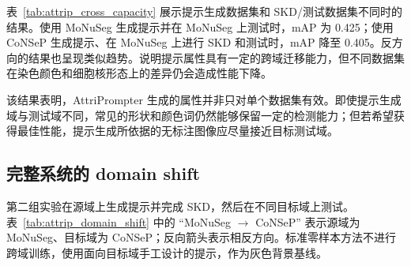 表~\ref{tab:attrip_cross_capacity} 展示提示生成数据集和 SKD/测试数据集不同时的结果。使用 MoNuSeg 生成提示并在 MoNuSeg 上测试时，mAP 为 0.425；使用 CoNSeP 生成提示、在 MoNuSeg 上进行 SKD 和测试时，mAP 降至 0.405。反方向的结果也呈现类似趋势。说明提示属性具有一定的跨域迁移能力，但不同数据集在染色颜色和细胞核形态上的差异仍会造成性能下降。

\begin{table}[t]
\caption{AttriPrompter 跨域能力验证。}
\label{tab:attrip_cross_capacity}
\begin{center}
\end{center}
\vskip -0.15in
\end{table}

该结果表明，AttriPrompter 生成的属性并非只对单个数据集有效。即使提示生成域与测试域不同，常见的形状和颜色词仍然能够保留一定的检测能力；但若希望获得最佳性能，提示生成所依据的无标注图像应尽量接近目标测试域。

\subsection{完整系统的 domain shift}

第二组实验在源域上生成提示并完成 SKD，然后在不同目标域上测试。表~\ref{tab:attrip_domain_shift} 中的 ``MoNuSeg $\rightarrow$ CoNSeP'' 表示源域为 MoNuSeg、目标域为 CoNSeP；反向箭头表示相反方向。标准零样本方法不进行跨域训练，使用面向目标域手工设计的提示，作为灰色背景基线。

